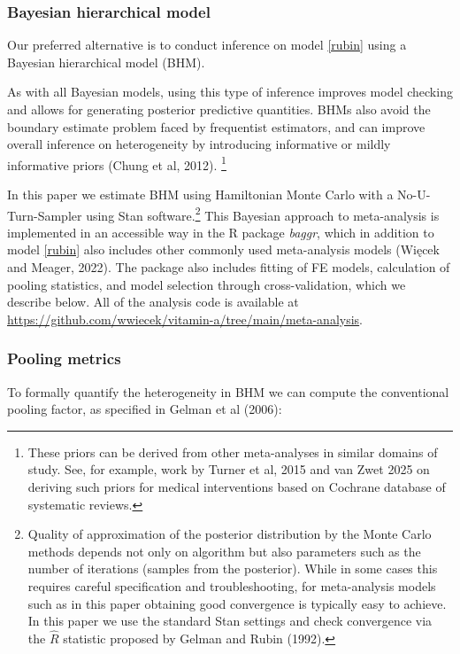\documentclass[12pt]{article}
\begin{document}
\subsubsection*{Bayesian hierarchical model}

Our preferred alternative is to conduct inference on model \eqref{rubin} using a Bayesian hierarchical model (BHM). 

As with all Bayesian models, using this type of inference improves model checking and allows for generating posterior predictive quantities. BHMs also avoid the boundary estimate problem faced by frequentist estimators, and can improve overall inference on heterogeneity by introducing informative or mildly informative priors (Chung et al, 2012). \footnote{These priors can be derived from other meta-analyses in similar domains of study. See, for example, work by Turner et al, 2015 and van Zwet 2025 on deriving such priors for medical interventions based on Cochrane database of systematic reviews.} 

In this paper we estimate BHM using Hamiltonian Monte Carlo with a No-U-Turn-Sampler using Stan software.\footnote{Quality of approximation of the posterior distribution by the Monte Carlo methods depends not only on algorithm but also parameters such as the number of iterations (samples from the posterior). While in some cases this requires careful specification and troubleshooting, for meta-analysis models such as in this paper obtaining good convergence is typically easy to achieve. In this paper we use the standard Stan settings and check convergence via the $\hat{R}$ statistic proposed by Gelman and Rubin (1992).} This Bayesian approach to meta-analysis is implemented in an accessible way in the R package \textit{baggr}, which in addition to model \eqref{rubin} also includes other commonly used meta-analysis models (Więcek and Meager, 2022). The package also includes fitting of FE models, calculation of pooling statistics, and model selection through cross-validation, which we describe below. All of the analysis code is available at \url{https://github.com/wwiecek/vitamin-a/tree/main/meta-analysis}.



\subsubsection*{Pooling metrics}

To formally quantify the heterogeneity in BHM we can compute the conventional pooling factor, as specified in Gelman et al (2006):
\end{document}
